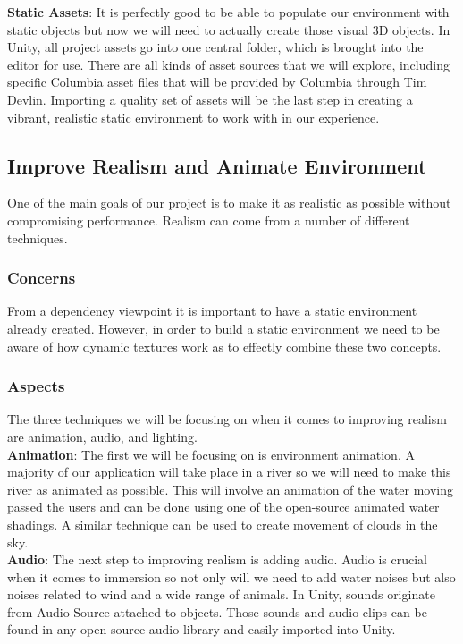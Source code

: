 \documentclass[10pt,journal,compsoc,onecolumn, draftclsnofoot]{IEEEtran}
\begin{document}
\hangindent=0.5cm \textbf{Static Assets}: It is perfectly good to be able to populate our environment with static objects but now we will need to actually create those visual 3D objects. In Unity, all project assets go into one central folder, which is brought into the editor for use. \cite{unity_importing_assets} There are all kinds of asset sources that we will explore, including specific Columbia asset files that will be provided by Columbia through Tim Devlin. Importing a quality set of assets will be the last step in creating a vibrant, realistic static environment to work with in our experience.\\

\subsection{Improve Realism and Animate Environment}
One of the main goals of our project is to make it as realistic as possible
without compromising performance. Realism can come from a number of different
techniques.
\subsubsection{Concerns}
From a dependency viewpoint it is important to have a static environment already created. However, in order to build a static environment we need to be aware of how dynamic textures work as to effectly combine these two concepts. 

\subsubsection{Aspects}
The three techniques we will be focusing on when it comes to improving realism are animation, audio, and lighting. \\

\hangindent=0.5cm \textbf{Animation}: The first we will be focusing on is environment animation. A majority of our application will take place in a river so we will need to make this river as animated as possible. This will involve an animation of the water moving passed the users and can be done using one of the open-source animated water shadings. A similar technique can be used to create movement of clouds in the sky.\\

\hangindent=0.5cm \textbf{Audio}: The next step to improving realism is adding audio. Audio is crucial when it comes to immersion so not only will we need to add water noises but also noises related to wind and a wide range of animals. In Unity, sounds originate from Audio Source attached to objects. Those sounds and audio clips can be found in any open-source audio library and easily imported into Unity. \\
\end{document}
